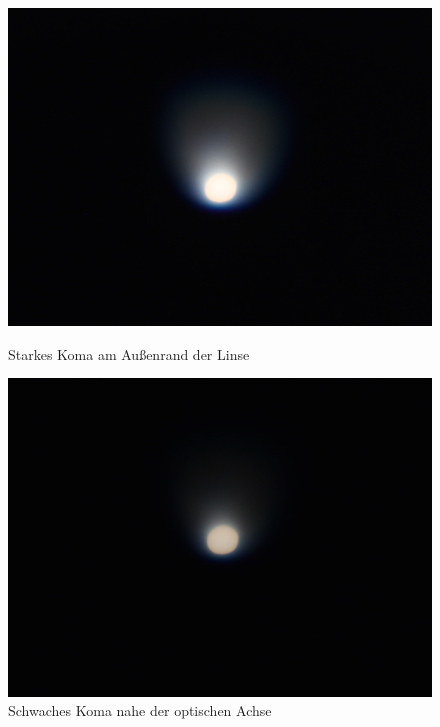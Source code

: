 \begin{figure}[h!]
	\begin{minipage}[t]{0.32\textwidth}
		\includegraphics[width=\linewidth]{img/Koma/Prakt_Linsenfehler_2015_06_04_097}
		\caption{Starkes Koma am Außenrand der Linse}
		\label{fig:koma_stark}
	\end{minipage}
	\hfill
	\begin{minipage}[t]{0.32\textwidth}
		\includegraphics[width=\linewidth]{img/Koma/Prakt_Linsenfehler_2015_06_04_096}
		\caption{Schwaches Koma nahe der optischen Achse}
		\label{fig:koma_schwach}
	\end{minipage}
	\hfill
	\begin{minipage}[t]{0.32\textwidth}

\end{minipage}
\end{figure}
